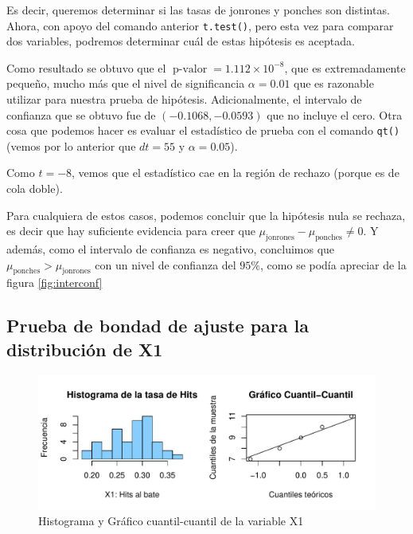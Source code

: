 \documentclass{staprojteamusb}
\begin{document}
 Es decir, queremos determinar si las tasas de jonrones y ponches son distintas. Ahora, con apoyo del comando anterior \texttt{t.test()}, pero esta vez para comparar dos variables, podremos determinar cuál de estas hipótesis es aceptada.

 Como resultado se obtuvo que el \(\operatorname{p-valor}=1.112\times 10^{-8}\), que es extremadamente pequeño, mucho más que el nivel de significancia \(\alpha = 0.01\) que es razonable utilizar para nuestra prueba de hipótesis. Adicionalmente, el intervalo de confianza que se obtuvo fue de \((-0.1068,-0.0593)\) que no incluye el cero. Otra cosa que podemos hacer es evaluar el estadístico de prueba con el comando \texttt{qt()} (vemos por lo anterior que \(dt = 55\) y \(\alpha = 0.05\)).

 Como \(t=-8\), vemos que el estadístico cae en la región de rechazo (porque es de cola doble).

 Para cualquiera de estos casos, podemos concluir que la hipótesis nula se rechaza, es decir que hay suficiente evidencia para creer que \(\mu_{\operatorname{jonrones}} - \mu_{\operatorname{ponches}} \neq 0\). Y además, como el intervalo de confianza es negativo, concluimos que \(\mu_{\operatorname{ponches}} > \mu_{\operatorname{jonrones}}\) con un nivel de confianza del \(95\%\), como se podía apreciar de la figura \ref{fig:interconf}

 \hypertarget{prueba-de-bondad-de-ajuste-para-la-distribuciuxf3n-de-x1}{%
 \subsection{Prueba de bondad de ajuste para la distribución de X1}\label{prueba-de-bondad-de-ajuste-para-la-distribuciuxf3n-de-x1}}

 \begin{figure}[h]
 \centering
 \includegraphics{C03322-InformeFinal-Cordero-Gavazut-Riera_files/figure-latex/cuantilcuantil-1.pdf}
 \caption{\label{fig:cuantilcuantil}Histograma y Gráfico cuantil-cuantil de la variable X1}
 \end{figure}
\end{document}
